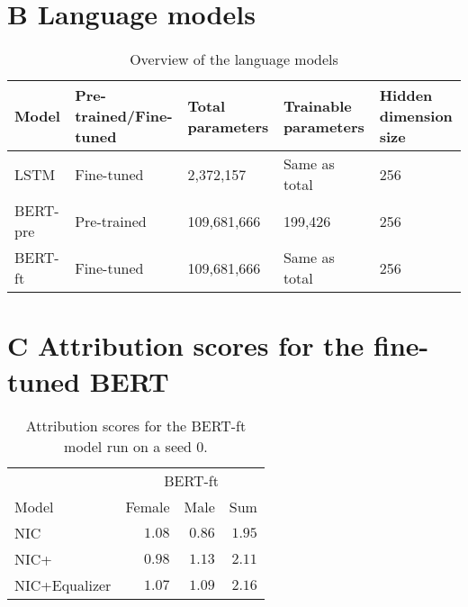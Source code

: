 \chapter{\textbf{B \quad Language models}}

\begin{table}[H]
    \centering
    \renewcommand{\arraystretch}{1} %
    \begin{tabular}{p{0.8in}p{0.8in}p{0.8in}p{0.79in}p{1in}}
    \toprule
        Model & Pre-trained/Fine-tuned & Total parameters & Trainable parameters & Hidden dimension size \\
        \hline
        LSTM \cite{6795963} & Fine-tuned & 2,372,157 & Same as total & 256\\
        BERT-pre \cite{bertpaper} & Pre-trained & 109,681,666 & 199,426 & 256 \\
        BERT-ft \cite{bertpaper} & Fine-tuned & 109,681,666 & Same as total & 256 \\
        
    \bottomrule 
    \end{tabular}
    \caption{Overview of the language models}
    \label{table:languagueModels}
\end{table}

\newpage
\chapter{\textbf{C \quad Attribution scores for the fine-tuned BERT}}

\begin{table}[H]
\begin{center}
\setlength{\tabcolsep}{4.25pt} %
\renewcommand{\arraystretch}{1.25} %
\begin{tabular}{lrrr}
\toprule
\multicolumn{1}{c}{} & 
\multicolumn{3}{c}{BERT-ft}

\\
\cmidrule(r){2-4}
Model & Female & Male & Sum \\
\hline
NIC \cite{NIC:2015} & $1.08$ & $0.86$ & $1.95$ \\

NIC+ \cite{NICplusNICEqualizer:2018} & $0.98$ & $1.13$ & $2.11$\\

NIC+Equalizer \cite{NICplusNICEqualizer:2018} & $1.07$ & $1.09$ & $2.16$ \\

\bottomrule
\end{tabular}
\caption{Attribution scores for the BERT-ft model run on a seed 0. }
\label{table:attributionSumsBert}
\end{center}
\end{table}


